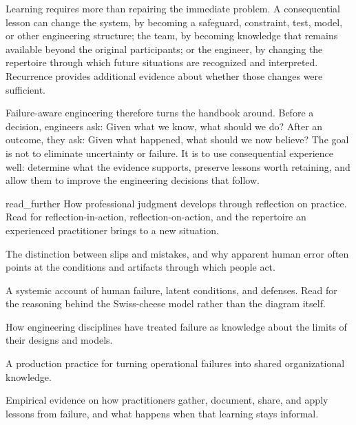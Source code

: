 Learning requires more than repairing the immediate problem. A consequential lesson can change the
system, by becoming a safeguard, constraint, test, model, or other engineering structure; the
team, by becoming knowledge that remains available beyond the original participants; or the
engineer, by changing the repertoire through which future situations are recognized and
interpreted. Recurrence provides additional evidence about whether those changes were sufficient.

Failure-aware engineering therefore turns the handbook around. Before a decision, engineers ask:
Given what we know, what should we do? After an outcome, they ask: Given what happened, what
should we now believe? The goal is not to eliminate uncertainty or failure. It is to use
consequential experience well: determine what the evidence supports, preserve lessons worth
retaining, and allow them to improve the engineering decisions that follow.

\begin{bookbox}{read_further}{} %
\citep{schon1983reflective} How professional judgment develops through reflection on practice. Read for
reflection-in-action, reflection-on-action, and the repertoire an experienced practitioner brings to
a new situation.

\citep{norman2013} The distinction between slips and mistakes, and why apparent human error often points
at the conditions and artifacts through which people act.

\citep{reason1990humanerror} A systemic account of human failure, latent conditions, and defenses. Read
for the reasoning behind the Swiss-cheese model rather than the diagram itself.

\citep{petroski1992} How engineering disciplines have treated failure as knowledge about the limits of
their designs and models.

\citep{lunney2016postmortem} A production practice for turning operational failures into shared
organizational knowledge.

\citep{anandayuvaraj2026failures} Empirical evidence on how practitioners gather, document, share, and
apply lessons from failure, and what happens when that learning stays informal.
\end{bookbox}
